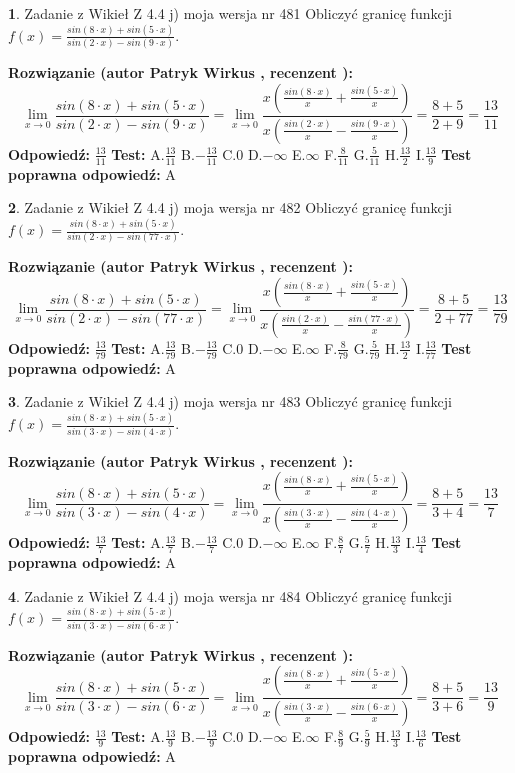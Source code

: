 \documentclass[12pt, a4paper]{article}
\theoremstyle{definition} %
\newtheorem{zad}{}
\newcommand{\zadStart}[1]{\begin{zad}#1\newline}
\newcommand{\zadStop}{\end{zad}}
\newcommand{\rozwStart}[2]{\noindent \textbf{Rozwiązanie (autor #1 , recenzent #2): }\newline}
\newcommand{\rozwStop}{\newline}
\newcommand{\odpStart}{\noindent \textbf{Odpowiedź:}\newline}
\newcommand{\odpStop}{\newline}
\newcommand{\testStart}{\noindent \textbf{Test:}\newline}
\newcommand{\testStop}{\newline}
\newcommand{\kluczStart}{\noindent \textbf{Test poprawna odpowiedź:}\newline}
\newcommand{\kluczStop}{\newline}
\begin{document}
\zadStart{Zadanie z Wikieł Z 4.4 j) moja wersja nr 481}
Obliczyć granicę funkcji $f(x)=\frac{sin(8\cdot x) +sin(5\cdot x)}{sin(2\cdot x) -sin(9\cdot x)}$.
\zadStop
\rozwStart{Patryk Wirkus}{}
$$\lim\limits_{x\to 0}\frac{sin(8\cdot x) +sin(5\cdot x)}{sin(2\cdot x) -sin(9\cdot x)}=\lim\limits_{x\to 0}\frac{x(\frac{sin(8\cdot x)}{x}+\frac{sin(5\cdot x)}{x})}{x(\frac{sin(2\cdot x)}{x}-\frac{sin(9\cdot x)}{x})}=\frac{8+5}{2+9} = \frac{13}{11}$$
\rozwStop
\odpStart
$\frac{13}{11}$
\odpStop
\testStart
A.$\frac{13}{11}$
B.$-\frac{13}{11}$
C.$0$
D.$-\infty$
E.$\infty$
F.$\frac{8}{11}$
G.$\frac{5}{11}$
H.$\frac{13}{2}$
I.$\frac{13}{9}$
\testStop
\kluczStart
A
\kluczStop



\zadStart{Zadanie z Wikieł Z 4.4 j) moja wersja nr 482}
Obliczyć granicę funkcji $f(x)=\frac{sin(8\cdot x) +sin(5\cdot x)}{sin(2\cdot x) -sin(77\cdot x)}$.
\zadStop
\rozwStart{Patryk Wirkus}{}
$$\lim\limits_{x\to 0}\frac{sin(8\cdot x) +sin(5\cdot x)}{sin(2\cdot x) -sin(77\cdot x)}=\lim\limits_{x\to 0}\frac{x(\frac{sin(8\cdot x)}{x}+\frac{sin(5\cdot x)}{x})}{x(\frac{sin(2\cdot x)}{x}-\frac{sin(77\cdot x)}{x})}=\frac{8+5}{2+77} = \frac{13}{79}$$
\rozwStop
\odpStart
$\frac{13}{79}$
\odpStop
\testStart
A.$\frac{13}{79}$
B.$-\frac{13}{79}$
C.$0$
D.$-\infty$
E.$\infty$
F.$\frac{8}{79}$
G.$\frac{5}{79}$
H.$\frac{13}{2}$
I.$\frac{13}{77}$
\testStop
\kluczStart
A
\kluczStop



\zadStart{Zadanie z Wikieł Z 4.4 j) moja wersja nr 483}
Obliczyć granicę funkcji $f(x)=\frac{sin(8\cdot x) +sin(5\cdot x)}{sin(3\cdot x) -sin(4\cdot x)}$.
\zadStop
\rozwStart{Patryk Wirkus}{}
$$\lim\limits_{x\to 0}\frac{sin(8\cdot x) +sin(5\cdot x)}{sin(3\cdot x) -sin(4\cdot x)}=\lim\limits_{x\to 0}\frac{x(\frac{sin(8\cdot x)}{x}+\frac{sin(5\cdot x)}{x})}{x(\frac{sin(3\cdot x)}{x}-\frac{sin(4\cdot x)}{x})}=\frac{8+5}{3+4} = \frac{13}{7}$$
\rozwStop
\odpStart
$\frac{13}{7}$
\odpStop
\testStart
A.$\frac{13}{7}$
B.$-\frac{13}{7}$
C.$0$
D.$-\infty$
E.$\infty$
F.$\frac{8}{7}$
G.$\frac{5}{7}$
H.$\frac{13}{3}$
I.$\frac{13}{4}$
\testStop
\kluczStart
A
\kluczStop



\zadStart{Zadanie z Wikieł Z 4.4 j) moja wersja nr 484}
Obliczyć granicę funkcji $f(x)=\frac{sin(8\cdot x) +sin(5\cdot x)}{sin(3\cdot x) -sin(6\cdot x)}$.
\zadStop
\rozwStart{Patryk Wirkus}{}
$$\lim\limits_{x\to 0}\frac{sin(8\cdot x) +sin(5\cdot x)}{sin(3\cdot x) -sin(6\cdot x)}=\lim\limits_{x\to 0}\frac{x(\frac{sin(8\cdot x)}{x}+\frac{sin(5\cdot x)}{x})}{x(\frac{sin(3\cdot x)}{x}-\frac{sin(6\cdot x)}{x})}=\frac{8+5}{3+6} = \frac{13}{9}$$
\rozwStop
\odpStart
$\frac{13}{9}$
\odpStop
\testStart
A.$\frac{13}{9}$
B.$-\frac{13}{9}$
C.$0$
D.$-\infty$
E.$\infty$
F.$\frac{8}{9}$
G.$\frac{5}{9}$
H.$\frac{13}{3}$
I.$\frac{13}{6}$
\testStop
\kluczStart
A
\kluczStop
\end{document}
